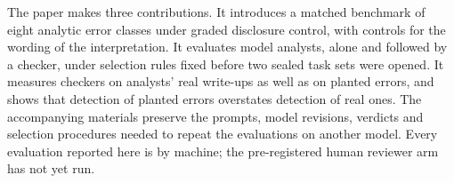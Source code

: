 The paper makes three contributions. It introduces a matched benchmark of eight analytic error classes under graded disclosure control, with controls for the wording of the interpretation. It evaluates model analysts, alone and followed by a checker, under selection rules fixed before two sealed task sets were opened. It measures checkers on analysts' real write-ups as well as on planted errors, and shows that detection of planted errors overstates detection of real ones. The accompanying materials preserve the prompts, model revisions, verdicts and selection procedures needed to repeat the evaluations on another model. Every evaluation reported here is by machine; the pre-registered human reviewer arm has not yet run.
